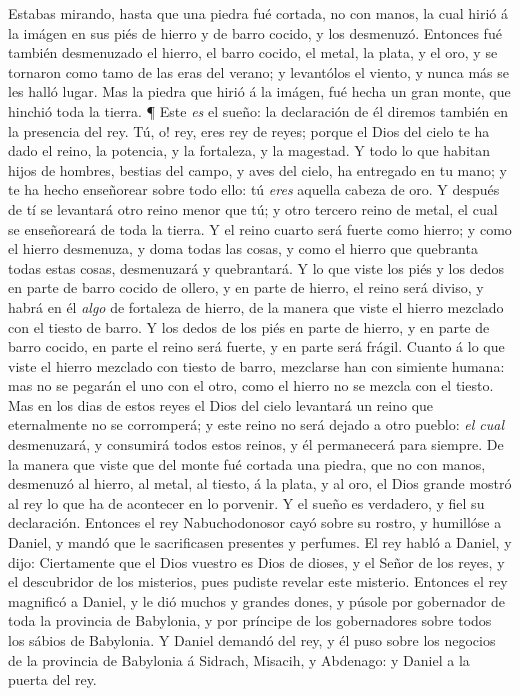\bverse Estabas mirando, hasta que una piedra
  fué cortada, no con manos, la cual
  hirió á la imágen en sus piés de hierro
  y de barro cocido, y los desmenuzó.
\bverse Entonces fué también desmenuzado
  el hierro, el barro cocido, el metal, la 
  plata, y el oro, y se tornaron como tamo
  de las eras del verano; y levantólos el
  viento, y nunca más se les halló lugar. 
  Mas la piedra que hirió á la imágen, fué 
  hecha un gran monte, que hinchió toda
  la tierra.
\bverse ¶ Este \emph{es} el sueño: la declaración
  de él diremos también en la presencia
  del rey.
\bverse Tú, o! rey, eres rey de reyes;
  porque el Dios del cielo te ha dado el reino,
  la potencia, y la fortaleza, y la magestad.
\bverse Y todo lo que habitan hijos de hombres,
  bestias del campo, y aves del cielo,
  ha entregado en tu mano; y te ha hecho
  enseñorear sobre todo ello: tú \emph{eres}
  aquella cabeza de oro.
\bverse Y después de tí se levantará otro 
  reino menor que tú; y otro tercero reino
  de metal, el cual se enseñoreará de
  toda la tierra.
\bverse Y el reino cuarto será fuerte como
  hierro; y como el hierro desmenuza, y 
  doma todas las cosas, y como el hierro
  que quebranta todas estas cosas,
  desmenuzará y quebrantará.
\bverse Y lo que viste los piés y los dedos
  en parte de barro cocido de ollero, y en
  parte de hierro, el reino será diviso, y
  habrá en él \emph{algo} de fortaleza de hierro, 
  de la manera que viste el hierro mezclado 
  con el tiesto de barro.
\bverse Y los dedos de los piés en parte de 
  hierro, y en parte de barro cocido, en parte 
  el reino será fuerte, y en parte será frágil.
\bverse Cuanto á lo que viste el hierro mezclado 
  con tiesto de barro, mezclarse han
  con simiente humana: mas no se pegarán
  el uno con el otro, como el hierro 
  no se mezcla con el tiesto.
\bverse Mas en los dias de estos reyes el
  Dios del cielo levantará un reino que
  eternalmente no se corromperá; y este 
  reino no será dejado a otro pueblo: \emph{el cual}
  desmenuzará, y consumirá todos estos 
  reinos, y él permanecerá para siempre.
\bverse De la manera que viste que del monte 
  fué cortada una piedra, que no con 
  manos, desmenuzó al hierro, al metal, al
  tiesto, á la plata, y al oro, el Dios grande
  mostró al rey lo que ha de acontecer en 
  lo porvenir. Y el sueño es verdadero,
  y fiel su declaración.
\bverse Entonces el rey Nabuchodonosor 
  cayó sobre su rostro, y humillóse a Daniel,
  y mandó que le sacrificasen presentes
  y perfumes.
\bverse El rey habló a Daniel, y dijo: 
  Ciertamente que el Dios vuestro es Dios de
  dioses, y el Señor de los reyes, y el 
  descubridor de los misterios, pues pudiste 
  revelar este misterio.
\bverse Entonces el rey magnificó a Daniel, 
  y le dió muchos y grandes dones, y 
  púsole por gobernador de toda la provincia 
  de Babylonia, y por príncipe de los 
  gobernadores sobre todos los sábios
  de Babylonia.
\bverse Y Daniel demandó del rey, y él puso 
  sobre los negocios de la provincia de 
  Babylonia á Sidrach, Misacih, y Abdenago:
  y Daniel a la puerta del rey.


